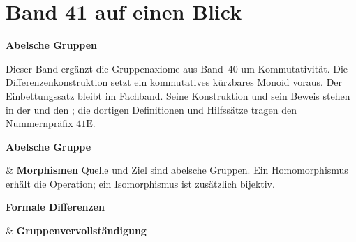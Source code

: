 \chapter[Band 41: Abelsche Gruppen]{Band 41 auf einen Blick}
\noindent\textbf{Abelsche Gruppen}\par\medskip
Dieser Band ergänzt die Gruppenaxiome aus Band~40 um Kommutativität.
Die Differenzenkonstruktion setzt ein kommutatives kürzbares Monoid voraus.
Der Einbettungssatz bleibt im Fachband. Seine Konstruktion und sein Beweis
stehen in der \DifferencesReadingLink{} und den \DifferencesProofsLink{};
die dortigen Definitionen und Hilfssätze tragen den Nummernpräfix \(41\mathrm E\).

\begin{BandUebersicht}
\textbf{Abelsche Gruppe}

&
\textbf{Morphismen}
Quelle und Ziel sind abelsche Gruppen. Ein Homomorphismus erhält die Operation; ein Isomorphismus ist zusätzlich bijektiv.
 \\
\addlinespace[.8ex]

\textbf{Formale Differenzen}

&
\textbf{Gruppenvervollständigung}

 \\
\addlinespace[.8ex]


\end{BandUebersicht}
